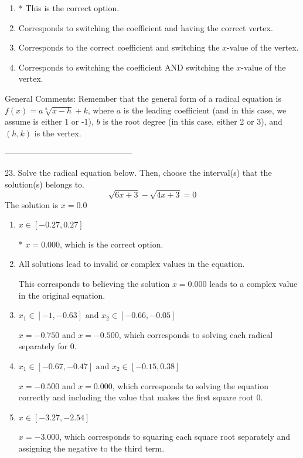 \documentclass{extbook}[14pt]
\begin{document}
\begin{enumerate}[label=\Alph*.] 
\item * This is the correct option.  
\item Corresponds to switching the coefficient and having the correct vertex.  
\item Corresponds to the correct coefficient and switching the $x$-value of the vertex.  
\item Corresponds to switching the coefficient AND switching the $x$-value of the vertex.  
\end{enumerate} 
 
General Comments: Remember that the general form of a radical equation is $ f(x) = a \sqrt[b]{x - h} + k $, where $a$ is the leading coefficient (and in this case, we assume is either 1 or -1), $b$ is the root degree (in this case, either 2 or 3), and $(h, k)$ is the vertex.

-----------------------------------------------

23. Solve the radical equation below. Then, choose the interval(s) that the solution(s) belongs to.
\[ \sqrt{6 x + 3} - \sqrt{4 x + 3} = 0 \] 
The solution is $ x = 0.0 $ 

\begin{enumerate}[label=\Alph*.] 
\item $ x \in [-0.27,0.27] $ 

 * $x = 0.000$, which is the correct option. 
\item $ \text{All solutions lead to invalid or complex values in the equation.} $ 

 This corresponds to believing the solution $x = 0.000$ leads to a complex value in the original equation. 
\item $ x_1 \in [-1, -0.63] \text{ and } x_2 \in [-0.66,-0.05] $ 

 $x = -0.750$ and $x = -0.500$, which corresponds to solving each radical separately for 0. 
\item $ x_1 \in [-0.67, -0.47] \text{ and } x_2 \in [-0.15,0.38] $ 

 $x = -0.500$ and $x = 0.000$, which corresponds to solving the equation correctly and including the value that makes the first square root 0. 
\item $ x \in [-3.27,-2.54] $ 

 $x = -3.000$, which corresponds to squaring each square root separately and assigning the negative to the third term. 
\end{enumerate} 
 
\end{document}
